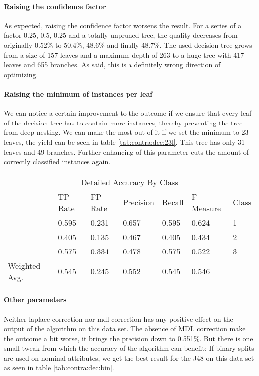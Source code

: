 \documentclass[paper=a4, fontsize=11pt]{scrartcl} %
\numberwithin{equation}{section} %
\numberwithin{figure}{section} %
\numberwithin{table}{section} %
\begin{document}
\paragraph{Raising the confidence factor}
As expected, raising the confidence factor worsens the result. For a series of a factor 0.25, 0.5, 0.25 and a totally unpruned tree, the quality decreases from originally 0.52\% to 50.4\%, 48.6\% and finally 48.7\%. The used decision tree grows from a size of 157 leaves and a maximum depth of 263 to a huge tree with 417 leaves and 655 branches. As said, this is a definitely wrong direction of optimizing.

\paragraph{Raising the minimum of instances per leaf}
We can notice a certain improvement to the outcome if we ensure that every leaf of the decision tree has to contain more instances, thereby preventing the tree from deep nesting. We can make the most out of it if we set the minimum to 23 leaves, the yield can be seen in table \ref{tab:contra:dec:23l}. This tree has only 31 leaves and 49 branches. Further enhancing of this parameter cuts the amount of correctly classified instances again.


\begin{table*}[htb]\centering
  \begin{tabular*}{\columnwidth}{@{}lllllll@{}}
      \toprule 
      \multicolumn{7}{c}{Detailed Accuracy By Class} \\ 
              &   TP Rate & FP Rate & Precision & Recall & F-Measure &  Class \\ \midrule      
              &   0.595   & 0.231   & 0.657     & 0.595  & 0.624     &  1     \\      
              &   0.405   & 0.135   & 0.467     & 0.405  & 0.434     &  2     \\      
              &   0.575   & 0.334   & 0.478     & 0.575  & 0.522     &  3     \\      
Weighted Avg. &   0.545   & 0.245   & 0.552     & 0.545  & 0.546     &        \\ \bottomrule     
    \end{tabular*}
\caption{Decision Tree on Contraceptive Data Set -- at least 23 instances per leaf} 
\label{tab:contra:dec:23l}
\end{table*}
\FloatBarrier
\paragraph{Other parameters}
Neither laplace correction nor mdl correction has any positive effect on the output of the algorithm on this data set. The absence of MDL correction make the outcome a bit worse, it brings the precision down to 0.551\%.  But there is one small tweak from which the accuracy of the algorithm can benefit: If binary splits are used on nominal attributes, we get the best result for the J48 on this data set as seen in table \ref{tab:contra:dec:bin}.
\end{document}
